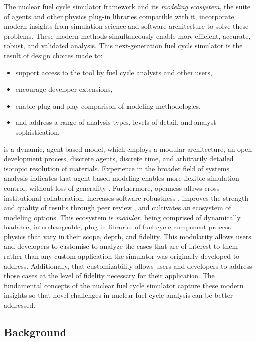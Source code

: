 The \Cyclus nuclear fuel cycle simulator framework and its \emph{modeling
ecosystem}, the suite of agents and other physics plug-in libraries compatible with it,
incorporate modern insights from simulation science and software architecture
to solve these problems.  These modern methods simultaneously enable more
efficient, accurate, robust, and validated analysis.  This next-generation fuel
cycle simulator is the result of design choices made to:

\begin{itemize}
\item support access to the tool by fuel cycle analysts and other users,
\item encourage developer extensions,
\item enable plug-and-play comparison of modeling methodologies,
\item and address a range of analysis types, levels of detail, and analyst sophistication.
\end{itemize}

\Cyclus is a dynamic, agent-based model, which employs a modular architecture,
an open development process, discrete agents, discrete time, and arbitrarily
detailed isotopic resolution of materials. Experience in the broader field of
systems analysis indicates that agent-based modeling enables more flexible
simulation control, without loss of generality
\cite{macal_agent-based_2010}. Furthermore, openness allows cross-institutional
collaboration, increases software robustness
\cite{cohen_modern_2010,fagan_design_2002}, improves
the strength and quality of results through peer review
\cite{donoho_reproducible_2009,ince_case_2012,stodden_scientific_2010,wicherts_willingness_2011,petre_code_2014}, and
cultivates an ecosystem of modeling options. This ecosystem is \emph{modular},
being comprised of dynamically loadable, interchangeable, plug-in libraries of fuel cycle component
process physics that vary in their scope, depth, and fidelity. This modularity
allows users and developers to customise \Cyclus to analyze the cases that are
of interest to them rather than any custom application the simulator was
originally developed to address. Additionally, that customizability allows
users and developers to address those cases at the level of fidelity necessary
for their application. The fundamental concepts of the \Cyclus
nuclear fuel cycle simulator capture these modern insights so that novel
challenges in nuclear fuel cycle analysis can be better addressed.

\subsection{Background}

